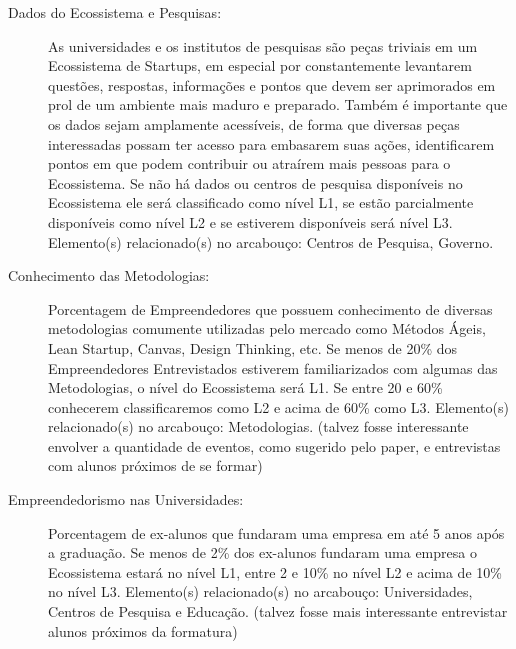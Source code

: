 \begin{description}
  \item [Dados do Ecossistema e Pesquisas:] As universidades e os institutos de pesquisas são peças triviais em um Ecossistema de Startups, em especial por constantemente levantarem questões, respostas, informações e pontos que devem ser aprimorados em prol de um ambiente mais maduro e preparado. Também é importante que os dados sejam amplamente acessíveis, de forma que diversas peças interessadas possam ter acesso para embasarem suas ações, identificarem pontos em que podem contribuir ou atraírem mais pessoas para o Ecossistema. Se não há dados ou centros de pesquisa disponíveis no Ecossistema ele será classificado como nível L1, se estão parcialmente disponíveis como nível L2 e se estiverem disponíveis será nível L3. Elemento(s) relacionado(s) no arcabouço: Centros de Pesquisa, Governo.
  
  \item [Conhecimento das Metodologias:] Porcentagem de Empreendedores que possuem conhecimento de diversas metodologias comumente utilizadas pelo mercado como Métodos Ágeis, Lean Startup, Canvas, Design Thinking, etc. Se menos de 20\% dos Empreendedores Entrevistados estiverem familiarizados com algumas das Metodologias, o nível do Ecossistema será L1. Se entre 20 e 60\% conhecerem classificaremos como L2 e acima de 60\% como L3. Elemento(s) relacionado(s) no arcabouço: Metodologias. (talvez fosse interessante envolver a quantidade de eventos, como sugerido pelo paper, e entrevistas com alunos próximos de se formar)
  
  \item [Empreendedorismo nas Universidades:] Porcentagem de ex-alunos que fundaram uma empresa em até 5 anos após a graduação. Se menos de 2\% dos ex-alunos fundaram uma empresa o Ecossistema estará no nível L1, entre 2 e 10\% no nível L2 e acima de 10\% no nível L3. Elemento(s) relacionado(s) no arcabouço: Universidades, Centros de Pesquisa e Educação. (talvez fosse mais interessante entrevistar alunos próximos da formatura)
  

\end{description}
